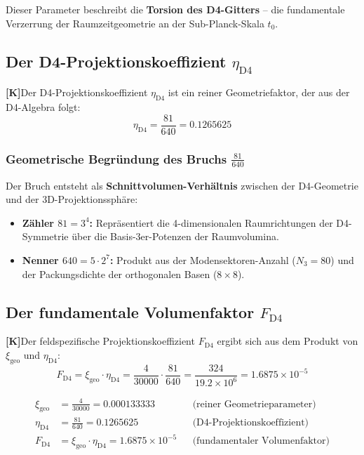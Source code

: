 \documentclass[11pt,a4paper]{article}
\newcommand{\xigeo}{\xi_{\text{geo}}}
\newcommand{\etaDfour}{\eta_{\text{D4}}}
\newcommand{\Kstatus}{\textbf{[K]}}
\begin{document}
	Dieser Parameter beschreibt die \textbf{Torsion des D4-Gitters} -- die fundamentale Verzerrung der Raumzeitgeometrie an der Sub-Planck-Skala $t_0$.
	
	\subsection{Der D4-Projektionskoeffizient $\etaDfour$}
	
	\Kstatus Der D4-Projektionskoeffizient $\etaDfour$ ist ein reiner Geometriefaktor, der aus der D4-Algebra folgt:
	\begin{equation}
		\etaDfour = \frac{81}{640} = 0.1265625
	\end{equation}
	
	\subsubsection{Geometrische Begründung des Bruchs $\frac{81}{640}$}
	
	Der Bruch entsteht als \textbf{Schnittvolumen-Verhältnis} zwischen der D4-Geometrie und der 3D-Projektionssphäre:
	
	\begin{itemize}
		\item \textbf{Zähler $81 = 3^4$:} Repräsentiert die 4-dimensionalen Raumrichtungen der D4-Symmetrie über die Basis-3er-Potenzen der Raumvolumina.
		\item \textbf{Nenner $640 = 5 \cdot 2^7$:} Produkt aus der Modensektoren-Anzahl ($N_3 = 80$) und der Packungsdichte der orthogonalen Basen ($8 \times 8$).
	\end{itemize}
	
	\subsection{Der fundamentale Volumenfaktor $F_{\text{D4}}$}
	
	\Kstatus Der feldspezifische Projektionskoeffizient $F_{\text{D4}}$ ergibt sich aus dem Produkt von $\xigeo$ und $\etaDfour$:
	\begin{equation}
		F_{\text{D4}} = \xigeo \cdot \etaDfour = \frac{4}{30000} \cdot \frac{81}{640} = \frac{324}{19.2 \times 10^6} = 1.6875 \times 10^{-5}
	\end{equation}
	
	\begin{tcolorbox}[colback=yellow!5!white,colframe=red!50!black,title=WICHTIG: Drei verschiedene Parameter]
		\begin{align}
			\xigeo &= \frac{4}{30000} = 0.000133333 &&\text{(reiner Geometrieparameter)} \\
			\etaDfour &= \frac{81}{640} = 0.1265625 &&\text{(D4-Projektionskoeffizient)} \\
			F_{\text{D4}} &= \xigeo \cdot \etaDfour = 1.6875 \times 10^{-5} &&\text{(fundamentaler Volumenfaktor)}
		\end{align}
		

	\end{tcolorbox}
	
\end{document}

